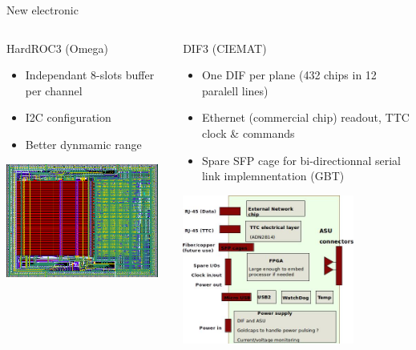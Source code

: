 \documentclass[10pt]{beamer}
\begin{document}
\begin{frame}[shrink=2]{ New electronic}
\begin{columns}
\begin{column}{0.5\textwidth}
\begin{block}{HardROC3 (Omega)}
\begin{itemize}
\item Independant 8-slots buffer per channel
\item I2C configuration
\item Better dynmamic range 
\end{itemize}

\end{block}
\centerline{\includegraphics[width=0.95\textwidth]{jpg/HR3.jpg}}

\end{column}
\begin{column}{0.5\textwidth}
\begin{block}{DIF3 (CIEMAT)}
\begin{itemize}
\item One DIF per plane (432 chips in 12 paralell lines)
\item Ethernet (commercial chip) readout, TTC clock \& commands
\item Spare SFP cage for bi-directionnal serial link implemnentation (GBT)
\end{itemize}

\end{block}
\centerline{\includegraphics[width=0.75\textwidth]{jpg/DIF3.jpg}}


\end{column}
\end{columns}
\end{frame}
\end{document}
